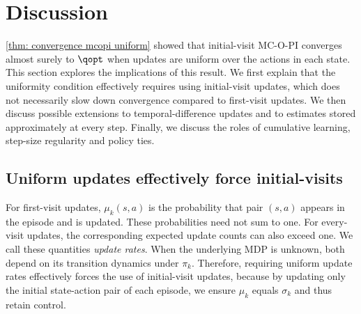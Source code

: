 \section{Discussion}
\label{sec: discussion}

\autoref{thm: convergence mcopi uniform} showed that initial-visit MC-O-PI converges almost surely to $\qopt$ 
when updates are uniform over the actions in each state.
% 
% 
This section explores the implications of this result.
We first explain that the uniformity condition effectively requires using initial-visit updates, which does not necessarily slow down convergence compared to first-visit updates.
We then discuss possible extensions to temporal-difference updates and to estimates stored approximately at every step.
Finally, we discuss the roles of cumulative learning, step-size regularity and policy ties.




\subsection{Uniform updates effectively force initial-visits}


For first-visit updates, $\mu_k(s,a)$ is the probability that pair $(s,a)$ appears in the episode and is updated. These probabilities need not sum to one. For every-visit updates, the corresponding expected update counts can also exceed one. We call these quantities \emph{update rates}. When the underlying MDP is unknown, both depend on its transition dynamics under $\pi_k$.
Therefore, requiring uniform update rates effectively forces the use of initial-visit updates,
because by updating only the initial state-action pair of each episode, we ensure $\mu_k$ equals $\sigma_k$ and thus retain control.

